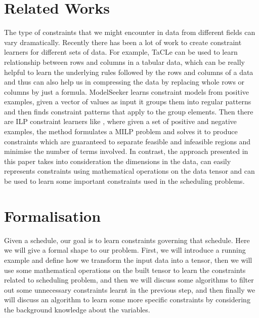 \documentclass{article}
\begin{document}
\section{Related Works}
The type of constraints that we might encounter in data from different fields can vary dramatically. Recently there has been a lot of work to create constraint learners for different sets of data. For example, TaCLe can be used to learn relationship between rows and columns in a tabular data, which can be really helpful to learn the underlying rules followed by the rows and columns of a data and thus can also help us in compressing the data by replacing whole rows or columns by just a formula. ModelSeeker learns constraint models from positive examples, given a vector of values as input it groups them into regular patterns and then finds constraint patterns that apply to the group elements. Then there are ILP constraint learners like \cite{MILP}, where given a set of positive and negative examples, the method formulates a MILP problem and solves it to produce constraints which are guaranteed to separate feasible and infeasible regions and minimise the number of terms involved. In contrast, the approach presented in this paper takes into consideration the dimensions in the data, can easily represents constraints using mathematical operations on the data tensor and can be used to learn some important constraints used in the scheduling problems. 

\section{Formalisation}

Given a schedule, our goal is to learn constraints governing that schedule. Here we will give a formal shape to our problem. 
First, we will introduce a running example and define how we transform the input data into a tensor, then we will use some mathematical operations on the built tensor to learn the constraints related to scheduling problem, and then we will discuss some algorithms to filter out some unnecessary constraints learnt in the previous step, and then finally we will discuss an algorithm to learn some more specific constraints by considering the background knowledge about the variables.
\end{document}
